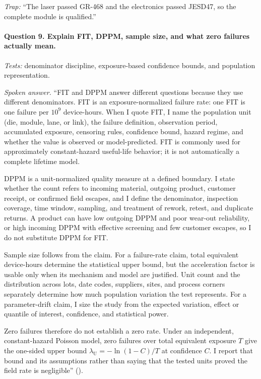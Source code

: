 \textit{Trap:} ``The laser passed GR-468 and the electronics passed JESD47, so
the complete module is qualified.''

\paragraph{Question 9. Explain FIT, DPPM, sample size, and what zero failures
actually mean.}
\textit{Tests:} denominator discipline, exposure-based confidence bounds, and
population representation.

\textit{Spoken answer.}
``FIT and DPPM answer different questions because they use different
denominators. FIT is an exposure-normalized failure rate: one FIT is one failure
per $10^{9}$ device-hours. When I quote FIT, I name the population unit (die,
module, lane, or link), the failure definition, observation period, accumulated
exposure, censoring rules, confidence bound, hazard regime, and whether the
value is observed or model-predicted. FIT is commonly used for approximately
constant-hazard useful-life behavior; it is not automatically a complete
lifetime model.

DPPM is a unit-normalized quality measure at a defined boundary. I state whether
the count refers to incoming material, outgoing product, customer receipt, or
confirmed field escapes, and I define the denominator, inspection coverage,
time window, sampling, and treatment of rework, retest, and duplicate returns.
A product can have low outgoing DPPM and poor wear-out reliability, or high
incoming DPPM with effective screening and few customer escapes, so I do not
substitute DPPM for FIT.

Sample size follows from the claim. For a failure-rate claim, total equivalent
device-hours determine the statistical upper bound, but the acceleration factor
is usable only when its mechanism and model are justified. Unit count and the
distribution across lots, date codes, suppliers, sites, and process corners
separately determine how much population variation the test represents. For a
parameter-drift claim, I size the study from the expected variation, effect or
quantile of interest, confidence, and statistical power.

Zero failures therefore do not establish a zero rate. Under an independent,
constant-hazard Poisson model, zero failures over total equivalent exposure
$T$ give the one-sided upper bound
$\lambda_{\mathrm{U}}=-\ln(1-C)/T$ at confidence $C$. I report that bound and
its assumptions rather than saying that the tested units proved the field rate
is negligible''
().

